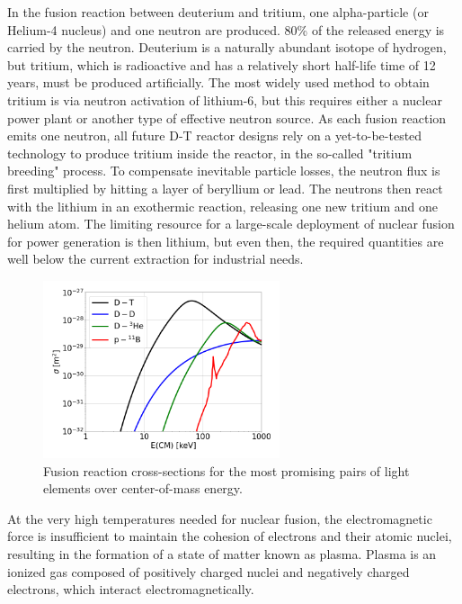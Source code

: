 In the fusion reaction between deuterium and tritium, one alpha-particle (or Helium-4 nucleus) and one neutron are produced. 80\% of the released energy is carried by the neutron. Deuterium is a naturally abundant isotope of hydrogen, but tritium, which is radioactive and has a relatively short half-life time of 12 years, must be produced artificially. The most widely used method to obtain tritium is via neutron activation of lithium-6, but this requires either a nuclear power plant or another type of effective neutron source. As each fusion reaction emits one neutron, all future D-T reactor designs rely on a yet-to-be-tested technology to produce tritium inside the reactor, in the so-called "tritium breeding" process. To compensate inevitable particle losses, the neutron flux is first multiplied by hitting a layer of beryllium or lead. The neutrons then react with the lithium in an exothermic reaction, releasing one new tritium and one helium atom. The limiting resource for a large-scale deployment of nuclear fusion for power generation is then lithium, but even then, the required quantities are well below the current extraction for industrial needs. \\


\begin{figure}[H]
	\centering
	\includegraphics[width=0.62\textwidth]{schemes/fusion-xsecs2.png}
	\caption{Fusion reaction cross-sections for the most promising pairs of light elements over center-of-mass energy.}
	\label{fig:Intro_fusionCrossSections}
\end{figure}


At the very high temperatures needed for nuclear fusion, the electromagnetic force is insufficient to maintain the cohesion of electrons and their atomic nuclei, resulting in the formation of a state of matter known as plasma. Plasma is an ionized gas composed of positively charged nuclei and negatively charged electrons, which interact electromagnetically. \newline

